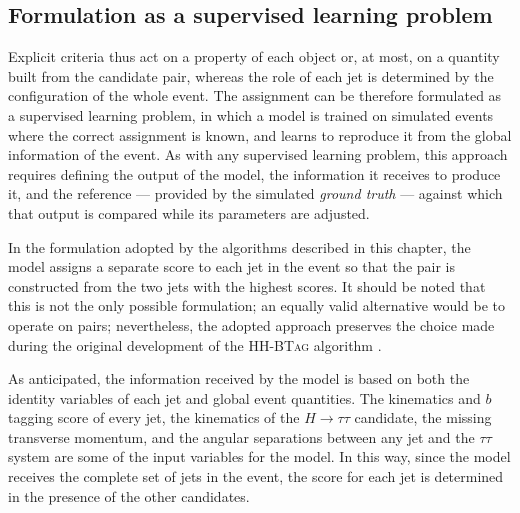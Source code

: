 

\subsection{Formulation as a supervised learning problem}
\label{subsec:supervised}
%
Explicit criteria thus act on a property of each object or, at most, on a quantity built from the candidate pair, whereas the role of each jet is determined by the configuration of the whole event. The assignment can be therefore formulated as a supervised learning problem, in which a model is trained on simulated events where the correct assignment is known, and learns to reproduce it from the global information of the event. As with any supervised learning problem, this approach requires defining the output of the model, the information it receives to produce it, and the reference — provided by the simulated \textit{ground truth} — against which that output is compared while its parameters are adjusted.\medskip

In the formulation adopted by the algorithms described in this chapter, the model assigns a separate score to each jet in the event so that the pair is constructed from the two jets with the highest scores. It should be noted that this is not the only possible formulation; an equally valid alternative would be to operate on pairs;
nevertheless, the adopted approach preserves the choice made during the original development of the \textsc{HH-BTag} algorithm \textcolor{red}{\cite{CMS-HIG-20-010,HHBTag}}.

As anticipated, the information received by the model is based on both the identity variables of each jet and global event quantities. The kinematics and $b$ tagging score of every jet, the kinematics of the $H\rightarrow\tau\tau$ candidate, the missing transverse momentum, and the angular separations between any jet and the $\tau\tau$ system are some of the input variables for the model. In this way, since the model receives the complete set of jets in the event, the score for each jet is determined in the presence of the other candidates. 

